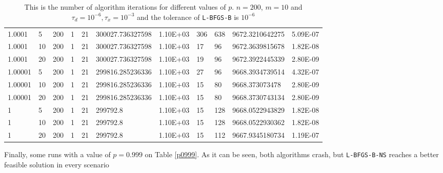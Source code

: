 \begin{table}
\begin{center}
\begin{tabular}{|l|l|l|l|l|l|l|l|l|l|l|}
      1.0001 & 5 & 200 &  1 & 21 & 300027.736327598 & 1.10E+03 & 306 & 638 & 9672.3210642275 & 5.09E-07\\
      1.0001 & 10 & 200 &  1 & 21 & 300027.736327598 & 1.10E+03 & 17 & 96 & 9672.3639815678 & 1.82E-08\\
      1.0001 & 20 & 200 &  1 & 21 & 300027.736327598 & 1.10E+03 & 19 & 96 & 9672.3922445339 & 2.80E-09\\
      1.00001 & 5 & 200 &  1 & 21 & 299816.285236336 & 1.10E+03 & 27 & 96 & 9668.3934739514 & 4.32E-07\\
      1.00001 & 10 & 200 &  1 & 21 & 299816.285236336 & 1.10E+03 & 15 & 80 & 9668.373073478 & 2.80E-09\\
      1.00001 & 20 & 200 &  1 & 21 & 299816.285236336 & 1.10E+03 & 15 & 80 & 9668.3730743134 & 2.80E-09\\
      1 & 5 & 200 & 1 &  21  & 299792.8 & 1.10E+03 & 15 & 128 & 9668.0522943829 & 1.82E-08\\
      1 & 10 & 200 & 1 &  21 & 299792.8 & 1.10E+03 & 15 & 128 & 9668.0522930362 & 1.82E-08\\
      1 & 20 & 200 & 1 &  21 & 299792.8 & 1.10E+03 & 15 & 112 & 9667.9345180734 & 1.19E-07\\
      \hline
    \end{tabular}
    \caption[Number of algorithm Iterations Changing $p$]{This is the number of algorithm iterations for different values of $p$. $n = 200$, $m = 10$ and $\tau_d = 10^{-6}, \tau_x = 10^{-3}$ and the tolerance of \texttt{L-BFGS-B} is $10^{-6}$ }
    \label{pmtable}
  \end{center}
\end{table}

Finally, some runs with a value of $p = 0.999$ on Table \ref{p0999}. As it can be seen, both algorithms crash, but \texttt{L-BFGS-B-NS} reaches a better feasible solution in every scenario

